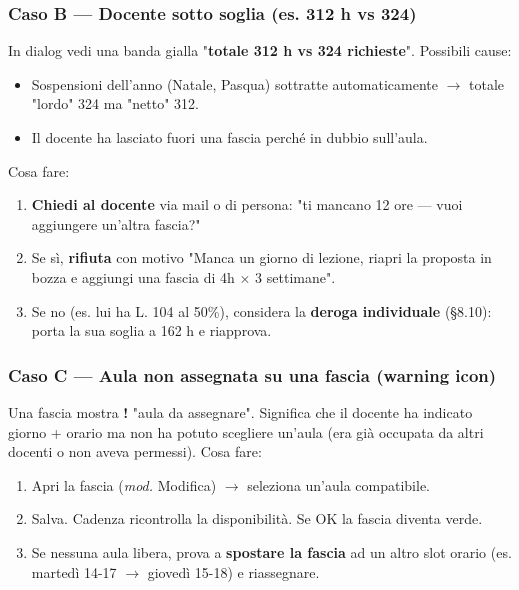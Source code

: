 \documentclass[11pt,a4paper]{article}
\begin{document}
\subsubsection{Caso B --- Docente sotto soglia (es. 312 h vs 324)}


In dialog vedi una banda gialla "\textbf{totale 312 h vs 324 richieste}". Possibili cause:

\begin{itemize}
  \item Sospensioni dell'anno (Natale, Pasqua) sottratte automaticamente $\rightarrow$ totale "lordo" 324 ma "netto" 312.
  \item Il docente ha lasciato fuori una fascia perché in dubbio sull'aula.
\end{itemize}

Cosa fare:

\begin{enumerate}
  \item \textbf{Chiedi al docente} via mail o di persona: "ti mancano 12 ore --- vuoi aggiungere un'altra fascia?"
  \item Se sì, \textbf{rifiuta} con motivo "Manca un giorno di lezione, riapri la proposta in bozza e aggiungi una fascia di 4h × 3 settimane".
  \item Se no (es. lui ha L. 104 al 50\%), considera la \textbf{deroga individuale} (§8.10): porta la sua soglia a 162 h e riapprova.
\end{enumerate}

\subsubsection{Caso C --- Aula non assegnata su una fascia (warning icon)}


Una fascia mostra \textbf{!} "aula da assegnare". Significa che il docente ha indicato giorno + orario ma non ha potuto scegliere un'aula (era già occupata da altri docenti o non aveva permessi). Cosa fare:

\begin{enumerate}
  \item Apri la fascia (\textit{mod.} Modifica) $\rightarrow$ seleziona un'aula compatibile.
  \item Salva. Cadenza ricontrolla la disponibilità. Se OK la fascia diventa verde.
  \item Se nessuna aula libera, prova a \textbf{spostare la fascia} ad un altro slot orario (es. martedì 14-17 $\rightarrow$ giovedì 15-18) e riassegnare.
\end{enumerate}
\end{document}
